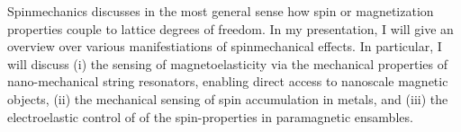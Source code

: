 Spinmechanics discusses in the most general sense how spin or magnetization properties couple to lattice degrees of freedom. 
In my presentation, I will give an overview over various manifestiations of spinmechanical effects. In particular, I will discuss (i) the sensing of magnetoelasticity via the mechanical properties of nano-mechanical string resonators, enabling direct access to nanoscale magnetic objects, (ii) the mechanical sensing of spin accumulation in metals, and (iii) the electroelastic control of of the spin-properties in paramagnetic ensambles.